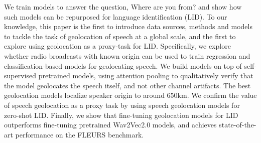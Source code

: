 We train models to answer the question, Where are you from? and show how such models can be repurposed for language identification (LID). To our knowledge, this paper is the first to introduce data sources, methods and models to tackle the task of geolocation of speech at a global scale, and the first to explore using geolocation as a proxy-task for LID. Specifically, we explore whether radio broadcasts with known origin can be used to train regression and classification-based models for geolocating speech. We build models on top of self-supervised pretrained models, using attention pooling to qualitatively verify that the model geolocates the speech itself, and not other channel artifacts. The best geolocation models localize speaker origin to around 650km. We confirm the value of speech geolocation as a proxy task by using speech geolocation models for zero-shot LID. Finally, we show that fine-tuning geolocation models for LID outperforms fine-tuning pretrained Wav2Vec2.0 models, and achieves state-of-the-art performance on the FLEURS benchmark.